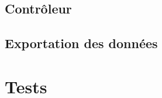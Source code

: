 \subsection{Contrôleur}
\lipsum[7]


\subsection{Exportation des données}
\lipsum[8]


\section{Tests}\label{tests}
